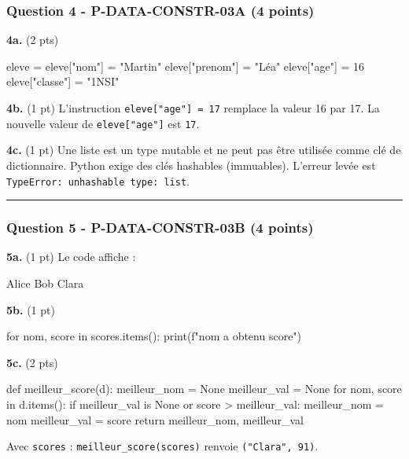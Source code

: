 \subsubsection{Question 4 - P-DATA-CONSTR-03A (4 points)}

\textbf{4a.} (2 pts)

\begin{python}
eleve = {}
eleve["nom"] = "Martin"
eleve["prenom"] = "Léa"
eleve["age"] = 16
eleve["classe"] = "1NSI"
\end{python}

\textbf{4b.} (1 pt) L'instruction \lstinline|eleve["age"] = 17|
remplace la valeur 16 par 17. La nouvelle valeur de
\lstinline|eleve["age"]| est \lstinline|17|.

\textbf{4c.} (1 pt) Une liste est un type mutable et ne peut pas être
utilisée comme clé de dictionnaire. Python exige des clés hashables
(immuables). L'erreur levée est
\texttt{TypeError:\ unhashable\ type:\ \textquotesingle{}list\textquotesingle{}}.

\begin{center}\rule{0.5\linewidth}{0.5pt}\end{center}

\subsubsection{Question 5 - P-DATA-CONSTR-03B (4 points)}

\textbf{5a.} (1 pt) Le code affiche :

\begin{python}
Alice
Bob
Clara
\end{python}

\textbf{5b.} (1 pt)

\begin{python}
for nom, score in scores.items():
    print(f"{nom} a obtenu {score}")
\end{python}

\textbf{5c.} (2 pts)

\begin{python}
def meilleur_score(d):
    meilleur_nom = None
    meilleur_val = None
    for nom, score in d.items():
        if meilleur_val is None or score > meilleur_val:
            meilleur_nom = nom
            meilleur_val = score
    return meilleur_nom, meilleur_val
\end{python}

Avec \texttt{scores} : \texttt{meilleur\_score(scores)} renvoie
\texttt{("Clara",\ 91)}.

